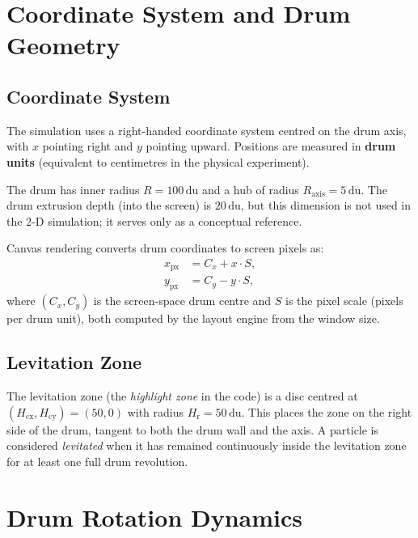 \documentclass[12pt, a4paper]{article}
\newcommand{\Hcx}{H_{\mathrm{cx}}}
\newcommand{\Hr}{H_{\mathrm{r}}}
\begin{document}
\section{Coordinate System and Drum Geometry}

\subsection{Coordinate System}

The simulation uses a right-handed coordinate system centred on the drum axis,
with $x$ pointing right and $y$ pointing upward. Positions are measured in
\textbf{drum units} (equivalent to centimetres in the physical experiment).

The drum has inner radius $R = 100\,\mathrm{du}$ and a hub of radius
$R_{\mathrm{axis}} = 5\,\mathrm{du}$. The drum extrusion depth (into the
screen) is $20\,\mathrm{du}$, but this dimension is not used in the 2-D
simulation; it serves only as a conceptual reference.

Canvas rendering converts drum coordinates to screen pixels as:
\begin{align}
  x_{\mathrm{px}} &= C_x + x \cdot S, \\
  y_{\mathrm{px}} &= C_y - y \cdot S,
\end{align}
where $(C_x, C_y)$ is the screen-space drum centre and $S$ is the pixel scale
(pixels per drum unit), both computed by the layout engine from the window size.

\subsection{Levitation Zone}

The levitation zone (the \emph{highlight zone} in the code) is a disc centred
at $(\Hcx, H_{\mathrm{cy}}) = (50, 0)$ with radius $\Hr = 50\,\mathrm{du}$.
This places the zone on the right side of the drum, tangent to both the drum
wall and the axis. A particle is considered \emph{levitated} when it has
remained continuously inside the levitation zone for at least one full drum
revolution.

\section{Drum Rotation Dynamics}
\end{document}
